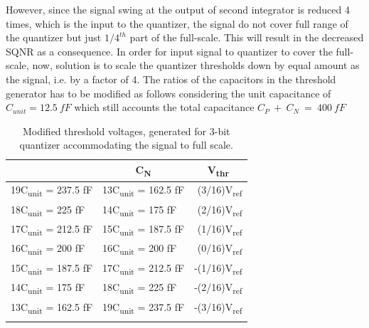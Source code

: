 However, since the signal swing at the output of second integrator is reduced 4 times, which is the input to the quantizer, the signal do not cover full range of the quantizer but just $1/4^{th}$ part of the full-scale. This will result in the decreased SQNR as a consequence. In order for input signal to quantizer to cover the full-scale, now, solution is to scale the quantizer thresholds down by equal amount as the signal, i.e. by a factor of 4. The ratios of the capacitors in the threshold generator has to be modified as follows considering the unit capacitance of $C_{unit}=12.5~fF$ which still accounts the total capacitance $C_P~+~C_N~=~400~fF$ 
%
\begin{table}[h!]
\centering
\begin{tabular}{l|l|r}
\Xhline{4\arrayrulewidth}
\multicolumn{1}{c|}{\textbf{C\textsubscript{P}}}        & \multicolumn{1}{c|}{\textbf{C\textsubscript{N}}}     & \multicolumn{1}{c}{\textbf{V\textsubscript{thr}}}       \\ \hline
19C\textsubscript{unit} = 237.5 fF & 13C\textsubscript{unit} = 162.5 fF & (3/16)V\textsubscript{ref}  \\ \hline
18C\textsubscript{unit} = 225 fF      & 14C\textsubscript{unit} = 175 fF   & (2/16)V\textsubscript{ref}  \\ \hline
17C\textsubscript{unit} = 212.5 fF    & 15C\textsubscript{unit} = 187.5 fF & (1/16)V\textsubscript{ref}  \\ \hline
16C\textsubscript{unit} = 200 fF      & 16C\textsubscript{unit} = 200 fF   & (0/16)V\textsubscript{ref}  \\ \hline
15C\textsubscript{unit} = 187.5 fF    & 17C\textsubscript{unit} = 212.5 fF & -(1/16)V\textsubscript{ref} \\ \hline
14C\textsubscript{unit} = 175 fF      & 18C\textsubscript{unit} = 225 fF   & -(2/16)V\textsubscript{ref} \\ \hline
13C\textsubscript{unit} = 162.5 fF    & 19C\textsubscript{unit} = 237.5 fF & -(3/16)V\textsubscript{ref} \\ \Xhline{4\arrayrulewidth}
\end{tabular}
\caption{Modified threshold voltages, generated for 3-bit quantizer accommodating the signal to full scale.}
\label{tab:vthr_mod}
\end{table}
%
